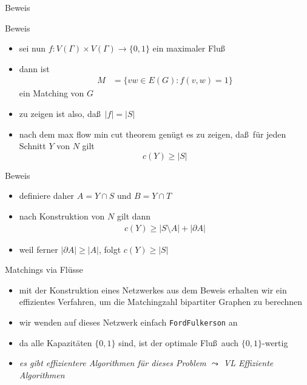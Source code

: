 \documentclass[aspectratio=1610, 11pt]{beamer}
\begin{document}
\begin{frame}
\begin{overprint}
\begin{exampleblock}{Beweis}
		\end{exampleblock}
		\begin{exampleblock}{Beweis}
			\begin{itemize}
				\item sei nun $f:V(\Gamma)\times V(\Gamma)\to\{0,1\}$ ein maximaler Flu\ss
				\item dann ist
					\begin{align*}
						M&=\{vw\in E(G):f(v,w)=1\}
					\end{align*}
					ein Matching von $G$
				\item zu zeigen ist also, da\ss\ $|f|=|S|$
				\item nach dem max flow min cut theorem gen\"ugt es zu zeigen, da\ss\ f\"ur jeden Schnitt $Y$ von $N$ gilt
					$$c(Y)\geq|S|$$
			\end{itemize}
		\end{exampleblock}
		\begin{exampleblock}{Beweis}
			\begin{itemize}
				\item definiere daher $A=Y\cap S$ und $B=Y\cap T$
				\item nach Konstruktion von $N$ gilt dann
					\begin{align*}
						c(Y)\geq|S\setminus A|+|\partial A|
					\end{align*}
				\item weil ferner $|\partial A|\geq|A|$, folgt $c(Y)\geq|S|$
			\end{itemize}
		\end{exampleblock}
		\begin{exampleblock}{Matchings via Fl\"usse}
			\begin{itemize}
				\item mit der Konstruktion eines Netzwerkes aus dem Beweis erhalten wir ein effizientes Verfahren, um die Matchingzahl bipartiter Graphen zu berechnen
				\item wir wenden auf dieses Netzwerk einfach {\tt FordFulkerson} an
				\item da alle Kapazit\"aten $\{0,1\}$ sind, ist der optimale Flu\ss\ auch $\{0,1\}$-wertig
				\item \itshape es gibt effizientere Algorithmen f\"ur dieses Problem $\leadsto$ VL Effiziente Algorithmen
			\end{itemize}
		\end{exampleblock}
	\end{overprint}
\end{frame}
\end{document}
